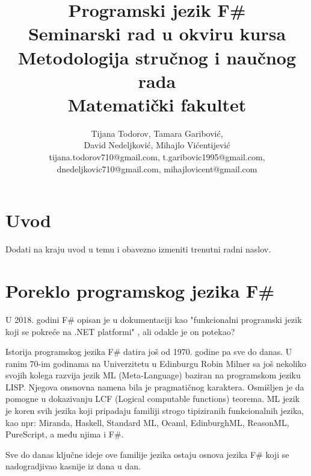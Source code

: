 \documentclass[a4paper]{article}
\begin{document}
\title{Programski jezik F\#\\ \small{Seminarski rad u okviru kursa\\Metodologija stručnog i naučnog rada\\ Matematički fakultet}}

\author{Tijana Todorov, Tamara Garibović,\\ David Nedeljković, Mihajlo Vićentijević \\ tijana.todorov710@gmail.com, t.garibovic1995@gmail.com, \\ dnedeljkovic710@gmail.com, mihajlovicent@gmail.com}


\maketitle


\tableofcontents

\newpage

\section{Uvod}
\label{sec:uvod}

Dodati na kraju uvod u temu i obavezno izmeniti trenutni radni naslov.

\section{Poreklo programskog jezika F\#}
\label{sec:poreklo}

U 2018. godini F\# opisan je u dokumentaciji kao "funkcionalni programski jezik koji se pokreće na .NET platformi" \cite{early_history}, ali odakle je on potekao?

Istorija programskog jezika F\# datira još od 1970. godine pa sve do danas. U ranim 70-im godinama na Univerzitetu u Edinburgu Robin Milner sa još nekoliko svojih kolega razvija jezik ML (Meta-Language) baziran na programskom jeziku LISP. Njegova onsnovna namena bila je pragmatičnog karaktera. Osmišljen je da pomogne u dokazivanju LCF (Logical computable functions) \cite{Milner:1972:LCF:891954} teorema. ML jezik je koren svih jezika koji pripadaju familiji strogo tipiziranih funkcionalnih jezika, kao npr: Miranda, Haskell, Standard ML, Ocaml, EdinburghML, ReasonML, PureScript, a među njima i F\#.

Sve do danas ključne ideje ove familije jezika ostaju osnova jezika F\# koji se nadogradjivao kasnije iz dana u dan. 
\end{document}
